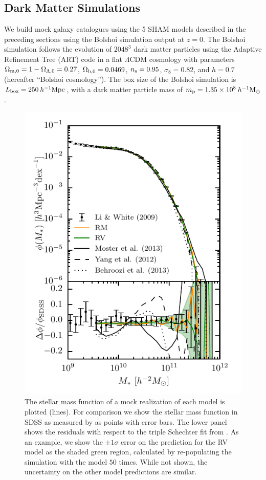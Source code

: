 \documentclass[useAMS,fleqn,usenatbib]{mnras}
\begin{document}
\subsection{Dark Matter Simulations}
\label{sec:dm_sim}

We build mock galaxy catalogues using the 5 SHAM models described in the preceding sections using the Bolshoi \citep{Klypin:2011bd} simulation output at $z=0$.  The Bolshoi simulation follows the evolution of $2048^3$ dark matter particles using the Adaptive Refinement Tree (ART) code \citep*{Kravtsov:1997iy} in a flat $\Lambda$CDM cosmology with parameters $\Omega_{{\rm m},0} = 1 - \Omega_{\Lambda,0} = 0.27$, ${\Omega}_{{\rm b},0} = 0.0469$, $n_{\rm s} = 0.95$, $\sigma_8 = 0.82$, and $h = 0.7$ (hereafter ``Bolshoi cosmology''). The box size of the Bolshoi simulation is $L_{\rm box} = 250 \>h^{-1}{\rm {Mpc}}$, with a dark matter particle mass of $m_{\rm p} = 1.35 \times 10^8 \>h^{-1}\rm M_\odot$.

\begin{figure}
    \includegraphics[width=\columnwidth]{figures/stellar_mass_function.pdf}
    \caption{The stellar mass function of a mock realization of each model is plotted (lines).  For comparison we show the stellar mass function in SDSS as measured by \citet{Li:2009kh} as points with error bars.  The lower panel shows the residuals with respect to the triple Schechter fit from \citet{Li:2009kh}. As an example, we show the $\pm 1 \sigma$ error on the prediction for the RV model as the shaded green region, calculated by re-populating the simulation with the model $50$ times. While not shown, the uncertainty on the other model predictions are similar.}
    \label{fig:phi}
\end{figure}
\end{document}
